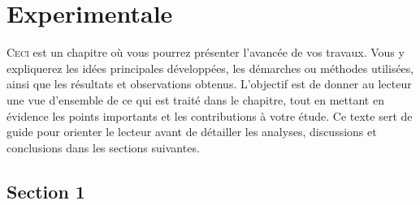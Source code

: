 

\graphicspath{{5_Images/6_Experimentale/}}                      %
\makeatletter
{}                    %
\makeatother


\chapter{Experimentale}\label{chap:Experimentale}               %

\begin{chapabstract}                                            %
    \lettrine[slope=0.5em,nindent=0.5em]{C}{eci}
    est un chapitre où vous pourrez présenter l’avancée de vos travaux. Vous y expliquerez les idées principales développées, les démarches ou méthodes utilisées, ainsi que les résultats et observations obtenus. L’objectif est de donner au lecteur une vue d’ensemble de ce qui est traité dans le chapitre, tout en mettant en évidence les points importants et les contributions à votre étude. Ce texte sert de guide pour orienter le lecteur avant de détailler les analyses, discussions et conclusions dans les sections suivantes.
\end{chapabstract}

\minitoc%
\newpage                                                        %


\section{Section 1}\label{sec:1_1}


